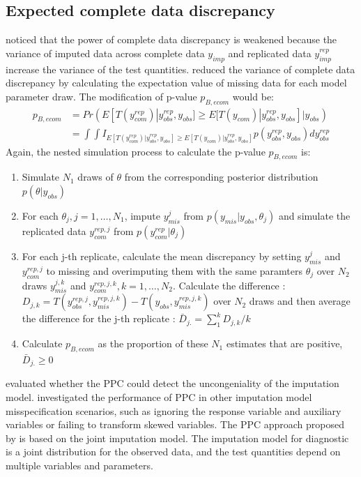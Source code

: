 	\subsection{Expected complete data discrepancy}
	\citet{he2012diagnosing} noticed that the power of complete data discrepancy is weakened because the variance of imputed data across complete data $y_{imp}$ and replicated data $y_{imp}^{rep}$ increase the variance of the test quantities. \citet{he2012diagnosing} reduced the variance of complete data discrepancy by calculating the expectation value of missing data for each model parameter draw. 
	The modification of p-value $p_{B, ecom}$ would be:  
	\begin{equation}
		\begin{array}{ll}
			p_{B, ecom} &= Pr(E[T(y_{com}^{rep})|y_{obs}^{rep}, y_{obs}] \ge E[T(y_{com})|y_{obs}^{rep}, y_{obs}]|y_{obs})\\
			&= \int\int I_{E[T(y_{com}^{rep})|y_{obs}^{rep}, y_{obs}] \ge E[T(y_{com})|y_{obs}^{rep}, y_{obs}]}p(y_{obs}^{rep}, y_{obs})dy_{obs}^{rep}
		\end{array} 
	\end{equation}
	Again, the nested simulation process to calculate the p-value $p_{B, ecom}$ is:
	\begin{enumerate}
		\item Simulate $N_{1}$ draws of $\theta$ from the corresponding posterior distribution $p(\theta|y_{obs})$
		\item For each $\theta_{j}, j=1, \dots, N_{1}$, impute $y_{mis}^j$ from $p(y_{mis}|y_{obs}, \theta_{j})$ and simulate the replicated data $y_{com}^{rep, j}$ from $p(y_{com}^{rep}|\theta_{j})$
		\item For each j-th replicate, calculate the mean discrepancy by setting $y_{mis}^j$ and $y_{com}^{rep, j}$ to missing and overimputing them with the same paramters $\theta_{j}$ over $N_{2}$ draws $y_{mis}^{j, k}$ and $y_{com}^{rep, j, k}, k = 1, \dots, N_{2}$. Calculate the difference : $D_{j, k} = T(y_{obs}^{rep, j}, y_{mis}^{rep, j, k}) - T(y_{obs}, y_{mis}^{rep, j, k})$ over $N_{2}$ draws and then average the difference for the j-th replicate : $\bar{D}_{j.} = \sum_{1}^{k}D_{j, k}/k$
		\item Calculate $p_{B, ecom}$ as the proportion of these $N_{1}$ estimates that are positive, $\bar{D}_{j.} \ge 0$    
	\end{enumerate}
	
	\citet{he2012diagnosing} evaluated whether the PPC could detect the uncongeniality of the imputation model. \citet{nguyen2015posterior} investigated the performance of PPC in other imputation model misspecification scenarios, such as ignoring the response variable and auxiliary variables or failing to transform skewed variables. The PPC approach proposed by \citet{he2012diagnosing} is based on the joint imputation model. The imputation model for diagnostic is a joint distribution for the observed data, and the test quantities depend on multiple variables and parameters. 
	
